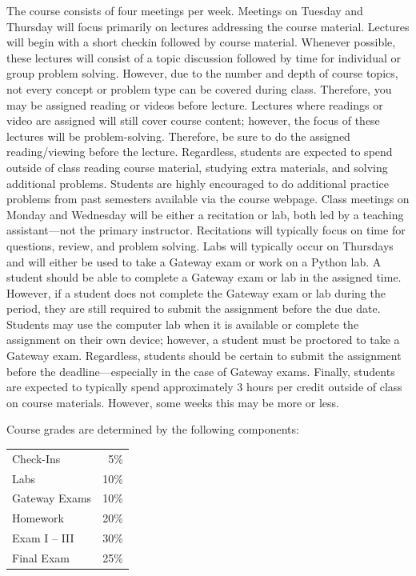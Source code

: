 \documentclass[11pt,letterpaper]{article}
\begin{document}

The course consists of four meetings per week. Meetings on Tuesday and Thursday will focus primarily on lectures addressing the course material. Lectures will begin with a short checkin followed by course material. Whenever possible, these lectures will consist of a topic discussion followed by time for individual or group problem solving. However, due to the number and depth of course topics, not every concept or problem type can be covered during class. Therefore, you may be assigned reading or videos before lecture. Lectures where readings or video are assigned will still cover course content; however, the focus of these lectures will be problem-solving. Therefore, be sure to do the assigned reading/viewing before the lecture. Regardless, students are expected to spend outside of class reading course material, studying extra materials, and solving additional problems. Students are highly encouraged to do additional practice problems from past semesters available via the course webpage. Class meetings on Monday and Wednesday will be either a recitation or lab, both led by a teaching assistant---not the primary instructor. Recitations will typically focus on time for questions, review, and problem solving. Labs will typically occur on Thursdays and will either be used to take a Gateway exam or work on a Python lab. A student should be able to complete a Gateway exam or lab in the assigned time. However, if a student does not complete the Gateway exam or lab during the period, they are still required to submit the assignment before the due date. Students may use the computer lab when it is available or complete the assignment on their own device; however, a student must be proctored to take a Gateway exam. Regardless, students should be certain to submit the assignment before the deadline---especially in the case of Gateway exams. Finally, students are expected to typically spend approximately 3 hours per credit outside of class on course materials. However, some weeks this may be more or less.
\sectionbreak






Course grades are determined by the following components: \par
	\begin{table}[!ht]
        \begin{tabular}{lr}
	Check-Ins & 5\% \\
	Labs & 10\% \\
	Gateway Exams& 10\% \\
	Homework & 20\% \\
	Exam I -- III & 30\% \\
	Final Exam & 25\%
        \end{tabular} 
        \end{table}
\pspace
\end{document}
